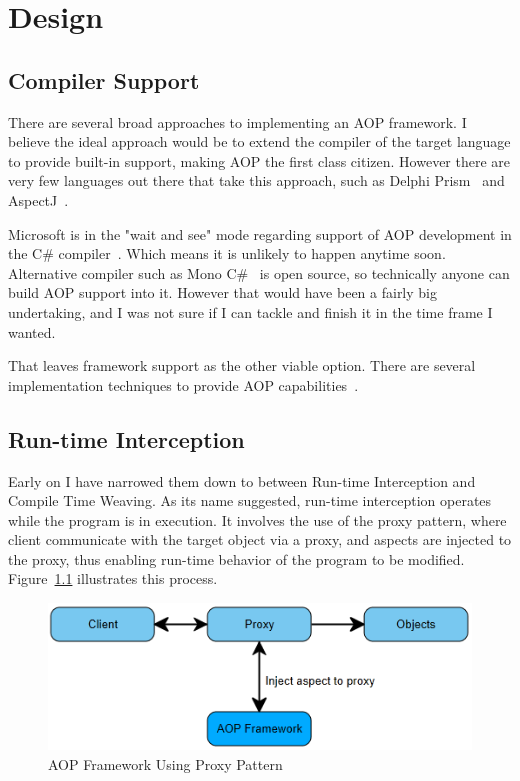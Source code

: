 \chapter{Design}

\section{Compiler Support}

There are several broad approaches to implementing an AOP framework. I believe the ideal approach would be to extend the compiler of the target language to provide built-in support, making AOP the first class citizen. However there are very few languages out there that take this approach, such as Delphi Prism~\cite{delphi_prism2010} and AspectJ~\cite{aspectj_faq, aspectj_text}. 

Microsoft is in the "wait and see" mode regarding support of AOP development in the C\# compiler~\cite{hejlsberg}. Which means it is unlikely to happen anytime soon. Alternative compiler such as Mono C\#~\cite{monocsharp} is open source, so technically anyone can build AOP support into it. However that would have been a fairly big undertaking, and I was not sure if I can tackle and finish it in the time frame I wanted.

That leaves framework support as the other viable option. There are several implementation techniques to provide AOP capabilities~\cite{aopcs, postsharp, aspectcs}.

\section{Run-time Interception}

Early on I have narrowed them down to between Run-time Interception and Compile Time Weaving. As its name suggested, run-time interception operates while the program is in execution. It involves the use of the proxy pattern, where client communicate with the target object via a proxy, and aspects are injected to the proxy, thus enabling run-time behavior of the program to be modified. Figure~\ref{proxy_model} illustrates this process.

\begin{figure}[H]
  \includegraphics[scale=1.0]{Proxy.PNG}
  \centering
  \caption{AOP Framework Using Proxy Pattern\label{proxy_model}}
\end{figure}

